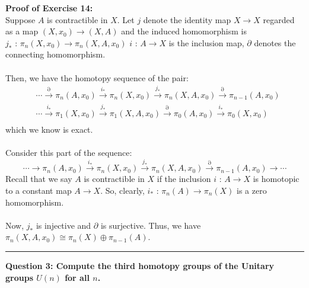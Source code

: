 \documentclass[11pt]{article}
\begin{document}
\vskip 0.5cm
\textbf{Proof of Exercise 14:}
\\
Suppose $A$ is contractible in $X$. Let $j$ denote the identity map $X \rightarrow X$ regarded as a map $(X, x_0) \rightarrow (X, A)$ and the induced homomorphism is $j_* \text{ : } \pi_n(X, x_0) \rightarrow \pi_n(X, A, x_0)$ $i \text{ : } A \rightarrow X$ is the inclusion map, $\partial$ denotes the connecting homomorphism.
\\
\\
Then, we have the homotopy sequence of the pair: 
\begin{align*}
  &\cdots \xrightarrow{\partial} \pi_n(A, x_0) \xrightarrow{i_*} \pi_n(X, x_0) \xrightarrow{j_*} \pi_n(X, A, x_0) \xrightarrow{\partial} \pi_{n-1}(A, x_0) \\
  &\cdots \xrightarrow{i_*} \pi_1(X, x_0) \xrightarrow{j_*} \pi_1(X, A, x_0) \xrightarrow{\partial} \pi_{0}(A, x_0) \xrightarrow{i_*} \pi_0(X, x_0) \\
\end{align*}
which we know is exact.
\\
\\
Consider this part of the sequence: 
$$ \cdots \rightarrow \pi_n(A, x_0) \xrightarrow{i_*} \pi_n(X, x_0) \xrightarrow{j_*} \pi_n(X, A, x_0) \xrightarrow{\partial} \pi_{n-1}(A, x_0) \rightarrow \cdots  $$ Recall that we say $A$ is contractible in $X$ if the inclusion $i \text{ : } A \rightarrow X$ is homotopic to a constant map $A \rightarrow X$. So, clearly, $i_* \text{ : } \pi_n(A) \rightarrow \pi_n(X)$ is a zero homomorphism.
\\
\\
Now, $j_*$ is injective and $\partial$ is surjective. Thus, we have $\pi_n(X, A, x_0) \cong \pi_n(X) \oplus \pi_{n-1}(A)$.


\vskip 0.5cm
\hrule
\pagebreak


\begin{bluebox}
  \textbf{Question 3: Compute the third homotopy groups of the Unitary groups $U(n)$ for all $n$.} 
\end{bluebox}
\end{document}

